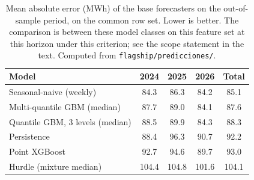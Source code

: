 \begin{table}[t]
\centering
\caption{Mean absolute error (MWh) of the base forecasters on the out-of-sample period, on the common row set. Lower is better. The comparison is between these model classes on this feature set at this horizon under this criterion; see the scope statement in the text. Computed from \texttt{flagship/predicciones/}.}
\label{tab:mae}
\begin{tabular}{lcccc}
\toprule
Model & 2024 & 2025 & 2026 & Total \\
\midrule
Seasonal-naive (weekly) & 84.3 & 86.3 & 84.2 & 85.1 \\
Multi-quantile GBM (median) & 87.7 & 89.0 & 84.1 & 87.6 \\
Quantile GBM, 3 levels (median) & 88.5 & 89.9 & 84.3 & 88.3 \\
Persistence & 88.4 & 96.3 & 90.7 & 92.2 \\
Point XGBoost & 92.7 & 94.6 & 89.7 & 93.0 \\
Hurdle (mixture median) & 104.4 & 104.8 & 101.6 & 104.1 \\
\bottomrule
\end{tabular}
\end{table}
